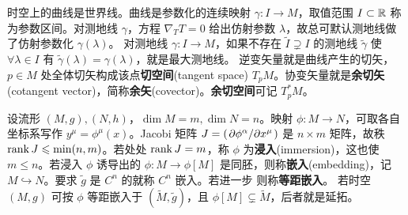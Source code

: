 时空上的曲线是世界线。曲线是参数化的连续映射 $\gamma:I\to M$，取值范围 $I\subset\mathbb{R}$ 称为参数区间。对测地线 $\gamma$，方程 $\nabla_T T=0$ 给出仿射参数 $\lambda$，故总可默认测地线做了仿射参数化 $\gamma(\lambda)$。
对测地线 $\gamma:I\to M$，如果不存在 $\tilde I\supsetneq I$ 的测地线 $\tilde \gamma$ 使 $\forall \lambda\in I$ 有 $\tilde \gamma(\lambda)=\gamma(\lambda)$，就是最大测地线。
逆变矢量就是曲线产生的切矢，$p\in M$ 处全体切矢构成该点\textbf{切空间}(tangent space) $T_p M$。协变矢量就是\textbf{余切矢}(cotangent vector)，简称\textbf{余矢}(covector)。\textbf{余切空间}可记 $T_p^* M$。

设流形 $(M,g),(N,h)$，$\dim M=m,\dim N=n$。映射 $\phi:M\to N$，可取各自坐标系写作 $y^\mu=\phi^\mu(x)$。Jacobi 矩阵 $J=(\pdv*{\phi^\alpha}{x^\mu})$ 是 $n\times m$ 矩阵，故秩 $\rank J\leqslant\min(n,m)$。若处处 $\rank J=m$，称 $\phi$ 为\textbf{浸入}(immersion)，这也使 $m\leqslant n$。若浸入 $\phi$ 诱导出的 $\phi:M\to\phi[M]$ 是同胚，则称\textbf{嵌入}(embedding)，记 $M\hookrightarrow N$。要求 $\tilde g$ 是 $C^n$ 的就称 $C^n$ 嵌入。若进一步
则称\textbf{等距嵌入}。
若时空 $(M,g)$ 可按 $\phi$ 等距嵌入于 $(\widetilde{M},\tilde g)$，且 $\phi[M]\subsetneq\widetilde{M}$，后者就是延拓。


